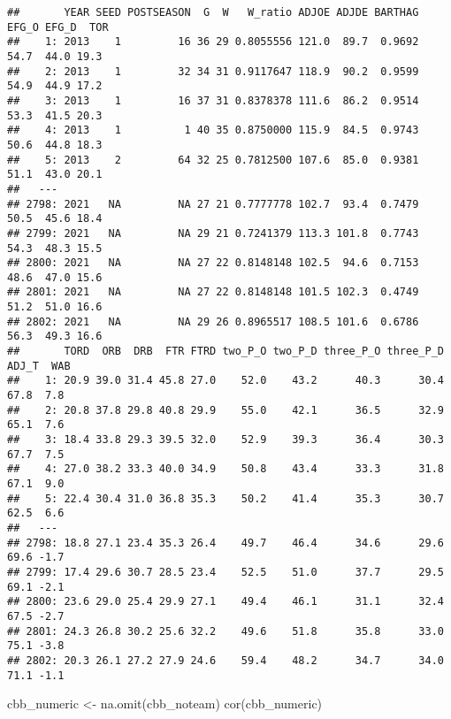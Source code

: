 \documentclass[
]{article}
\newenvironment{Shaded}{\begin{snugshade}}{\end{snugshade}}
\newcommand{\FunctionTok}[1]{\textcolor[rgb]{0.00,0.00,0.00}{#1}}
\newcommand{\NormalTok}[1]{#1}
\newcommand{\OtherTok}[1]{\textcolor[rgb]{0.56,0.35,0.01}{#1}}
\begin{document}
\begin{verbatim}
##       YEAR SEED POSTSEASON  G  W   W_ratio ADJOE ADJDE BARTHAG EFG_O EFG_D  TOR
##    1: 2013    1         16 36 29 0.8055556 121.0  89.7  0.9692  54.7  44.0 19.3
##    2: 2013    1         32 34 31 0.9117647 118.9  90.2  0.9599  54.9  44.9 17.2
##    3: 2013    1         16 37 31 0.8378378 111.6  86.2  0.9514  53.3  41.5 20.3
##    4: 2013    1          1 40 35 0.8750000 115.9  84.5  0.9743  50.6  44.8 18.3
##    5: 2013    2         64 32 25 0.7812500 107.6  85.0  0.9381  51.1  43.0 20.1
##   ---                                                                          
## 2798: 2021   NA         NA 27 21 0.7777778 102.7  93.4  0.7479  50.5  45.6 18.4
## 2799: 2021   NA         NA 29 21 0.7241379 113.3 101.8  0.7743  54.3  48.3 15.5
## 2800: 2021   NA         NA 27 22 0.8148148 102.5  94.6  0.7153  48.6  47.0 15.6
## 2801: 2021   NA         NA 27 22 0.8148148 101.5 102.3  0.4749  51.2  51.0 16.6
## 2802: 2021   NA         NA 29 26 0.8965517 108.5 101.6  0.6786  56.3  49.3 16.6
##       TORD  ORB  DRB  FTR FTRD two_P_O two_P_D three_P_O three_P_D ADJ_T  WAB
##    1: 20.9 39.0 31.4 45.8 27.0    52.0    43.2      40.3      30.4  67.8  7.8
##    2: 20.8 37.8 29.8 40.8 29.9    55.0    42.1      36.5      32.9  65.1  7.6
##    3: 18.4 33.8 29.3 39.5 32.0    52.9    39.3      36.4      30.3  67.7  7.5
##    4: 27.0 38.2 33.3 40.0 34.9    50.8    43.4      33.3      31.8  67.1  9.0
##    5: 22.4 30.4 31.0 36.8 35.3    50.2    41.4      35.3      30.7  62.5  6.6
##   ---                                                                        
## 2798: 18.8 27.1 23.4 35.3 26.4    49.7    46.4      34.6      29.6  69.6 -1.7
## 2799: 17.4 29.6 30.7 28.5 23.4    52.5    51.0      37.7      29.5  69.1 -2.1
## 2800: 23.6 29.0 25.4 29.9 27.1    49.4    46.1      31.1      32.4  67.5 -2.7
## 2801: 24.3 26.8 30.2 25.6 32.2    49.6    51.8      35.8      33.0  75.1 -3.8
## 2802: 20.3 26.1 27.2 27.9 24.6    59.4    48.2      34.7      34.0  71.1 -1.1
\end{verbatim}

\begin{Shaded}
\begin{Highlighting}[]
\NormalTok{cbb\_numeric }\OtherTok{\textless{}{-}} \FunctionTok{na.omit}\NormalTok{(cbb\_noteam)}
\FunctionTok{cor}\NormalTok{(cbb\_numeric)}
\end{Highlighting}
\end{Shaded}
\end{document}
